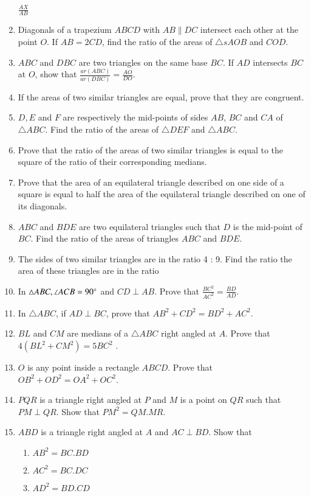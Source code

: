 \begin{enumerate}[label=\thesection.\arabic*.,ref=\thesection.\theenumi]
$\frac{AX}{ AB}$
% 
\item  Diagonals of a trapezium $ABCD$ with $AB  \parallel  DC$ intersect each other at the point $O$. If $AB = 2 CD$, find the ratio of the areas of $\triangle s AOB$ and $COD$.
\item  $ABC$ and $DBC$ are two triangles on the same base $BC$. If $AD$ intersects $BC$ at $O$, show that
$\frac{ar (ABC)}{ ar (DBC)}=\frac{AO}{  DO}$.
\item  If the areas of two similar triangles are equal, prove that they are congruent.
\item  $D, E$ and $F$ are respectively the mid-points of sides $AB$, $BC$ and $CA$ of  $\triangle  ABC$. Find the ratio of the areas of  $\triangle  DEF$ and  $\triangle  ABC$.
\item  Prove that the ratio of the areas of two similar triangles is equal to the square of the ratio of their corresponding medians.
\item  Prove that the area of an equilateral triangle described on one side of a square is equal to half the area of the equilateral triangle described on one of its diagonals.
\item $ABC$ and $BDE$ are two equilateral triangles such that $D$ is the mid-point of $BC$. Find the ratio of the areas of triangles $ABC$ and $BDE$.
\item The sides of two similar triangles are in the ratio 4 : 9. Find the ratio the area of  these triangles are in the ratio
\item In $\triangle ABC, \angle  ACB = 90\degree$ and $CD  \perp  AB$. Prove that 
$\frac{BC^2}{AC^2} = \frac{BD}{ AD}$.
\item In $\triangle ABC$,  if $AD  \perp  BC$, prove that $AB^2+ CD^2 = BD^2 + AC^2$.
\item $BL$ and $CM$ are medians of a $\triangle ABC$ right angled at $A$. Prove that $4 (BL^2 + CM^2
) = 5 BC^2$ .
\item $O$ is any point inside a rectangle $ABCD$. Prove that $OB^2+OD^2 = OA^2+OC^2$.
\item  $PQR$ is a triangle right angled at $P$ and $M$ is a point on $QR$ such that $PM  \perp  QR$. Show that $PM^2= QM . MR$.
\item  $ABD$ is a triangle right angled at $A$ and $AC \perp  BD$. Show that
\begin{enumerate}
\item  $AB^2 = BC . BD$
\item  $AC^2 = BC . DC$
\item  $AD^2  = BD . CD$

\end{enumerate}
\end{enumerate}
